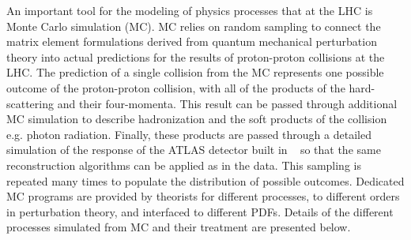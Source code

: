 An important tool for the modeling of physics processes
that at the LHC is Monte Carlo simulation (MC).
MC relies on random sampling to connect the matrix element formulations
derived from quantum mechanical perturbation theory into 
actual predictions for the results of proton-proton collisions
at the LHC.
The prediction of a single collision from the MC represents
one possible outcome of the proton-proton collision, with all of the 
products of the hard-scattering and their four-momenta.
This result can be passed through additional MC simulation to describe
hadronization and the soft products of the collision e.g. photon radiation.
Finally, these products are passed through a detailed 
simulation of the response of the 
ATLAS detector built in \geant~\cite{Agostinelli:2002hh}
so that the same reconstruction algorithms
can be applied as in the data.
This sampling is repeated many times to populate the 
distribution of possible
outcomes. Dedicated MC programs are provided by theorists for 
different processes, to different orders in perturbation theory,
and interfaced to different PDFs.
Details of the different processes simulated from MC and their
treatment are presented below.





\newpage




